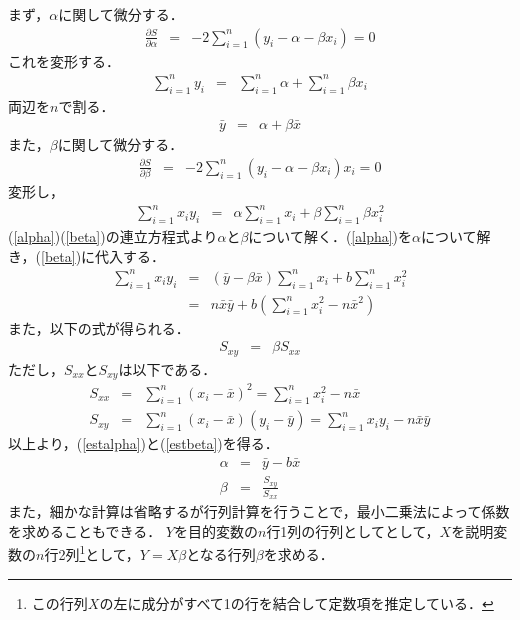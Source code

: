 \documentclass[a4paper,10pt,fleqn]{jarticle}
\begin{document}
\begin{description}
まず，$\alpha$に関して微分する．
\begin{eqnarray*}
\frac{\partial S}{\partial \alpha}&=&-2\sum\limits ^n_{i=1}\left( y_i-\alpha-\beta x_i \right)=0
\end{eqnarray*}
これを変形する．
\begin{eqnarray*}
\sum\limits ^n_{i=1}y_i&=&\sum\limits ^n_{i=1}\alpha+\sum\limits ^n_{i=1}\beta x_i
\end{eqnarray*}
両辺を$n$で割る．
\begin{eqnarray}
\bar{y}&=&\alpha+\beta\bar{x} \label{alpha}
\end{eqnarray}
また，$\beta$に関して微分する．
\begin{eqnarray*}
\frac{\partial S}{\partial \beta}&=&-2\sum\limits ^n_{i=1}\left( y_i-\alpha-\beta x_i \right)x_i=0
\end{eqnarray*}
変形し，
\begin{eqnarray}
\sum\limits ^n_{i=1}x_i y_i&=&\alpha \sum\limits ^n_{i=1}x_i+\beta\sum\limits ^n_{i=1}\beta x_i^2 \label{beta}
\end{eqnarray}
(\ref{alpha})(\ref{beta})の連立方程式より$\alpha$と$\beta$について解く．(\ref{alpha})を$\alpha$について解き，(\ref{beta})に代入する．
\begin{eqnarray*}
\sum \limits ^n_{i=1}x_i y_i&=&\left( \bar{y}-\beta \bar{x} \right)\sum \limits ^n_{i=1}x_i +b\sum \limits ^n_{i=1}x_i^2 \\
&=&n\bar{x}\bar{y}+b\left( \sum \limits ^n_{i=1}x_i^2 - n\bar{x}^2 \right)
\end{eqnarray*}
また，以下の式が得られる．
\begin{eqnarray*}
S_{xy}&=&\beta S_{xx}
\end{eqnarray*}
ただし，$S_{xx}$と$S_{xy}$は以下である．
\begin{eqnarray*}
S_{xx}&=&\sum \limits^n _{i=1}\left( x_i -\bar{x} \right)^2=\sum \limits^n _{i=1}x_i^2-n\bar{x}\\
S_{xy}&=&\sum \limits^n _{i=1}\left( x_i-\bar{x} \right)\left( y_i - \bar{y} \right)=\sum \limits^n _{i=1}x_i y_i -n\bar{x}\bar{y}
\end{eqnarray*}
以上より，(\ref{estalpha})と(\ref{estbeta})を得る．
\begin{eqnarray}
\alpha&=&\bar{y}-b\bar{x} \label{estalpha}\\
\beta  &=&\frac{S_{xy}}{S_{xx}} \label{estbeta}
\end{eqnarray}
また，細かな計算は省略するが行列計算を行うことで，最小二乗法によって係数を求めることもできる．
$Y$を目的変数の$n$行1列の行列としてとして，$X$を説明変数の$n$行2列\footnote[1]{この行列$X$の左に成分がすべて1の行を結合して定数項を推定している．}として，$Y=X\beta$となる行列$\beta$を求める．

\end{description}
\end{document}
